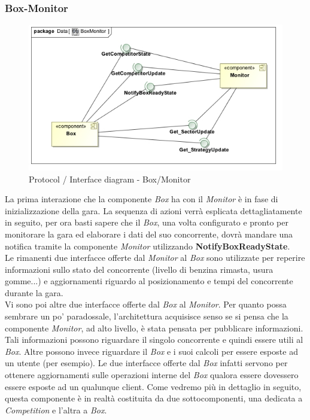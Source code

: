 \subsubsection{Box-Monitor}
\begin{center}
\begin{figure}[h!]
	\includegraphics[scale=0.55]{img/InteractionDiagram/Implementation_Diagram__BoxMonitor.jpg}
\caption{Protocol / Interface diagram - Box/Monitor}
\end{figure}
\end{center}
La prima interazione che la componente \emph{Box} ha con il \emph{Monitor} \`{e} in fase di inizializzazione della gara. 
La sequenza di azioni verr\`{a} esplicata
dettagliatamente in seguito, per ora basti sapere che il \emph{Box}, una volta configurato e pronto per monitorare 
la gara ed elaborare i dati del suo
concorrente, dovr\`{a} mandare una notifica tramite la componente \emph{Monitor} utilizzando \textbf{NotifyBoxReadyState}.\\
Le rimanenti due interfacce offerte dal \emph{Monitor} al \emph{Box} sono utilizzate per reperire informazioni sullo stato del 
concorrente (livello di benzina rimasta, usura gomme...) e
aggiornamenti riguardo al posizionamento e tempi del concorrente durante la gara.\\
Vi sono poi altre due interfacce offerte dal \emph{Box} al \emph{Monitor}. Per quanto possa sembrare un po' paradossale, l'architettura
acquisisce senso se si pensa che la componente \emph{Monitor}, ad alto livello, \`{e} stata pensata per pubblicare informazioni. Tali
informazioni possono riguardare il singolo concorrente e quindi essere utili al \emph{Box}. Altre possono invece riguardare il \emph{Box} e 
i suoi calcoli per essere esposte ad un utente (per esempio). Le due interfacce offerte dal \emph{Box} infatti servono per ottenere
aggiornamenti sulle operazioni interne del \emph{Box} qualora essere dovessero essere esposte ad un qualunque client. Come vedremo pi\`{u}
in dettaglio in seguito, questa componente \`{e} in realt\`{a} costituita da due sottocomponenti, una dedicata a \emph{Competition} e l'altra a
\emph{Box}.
